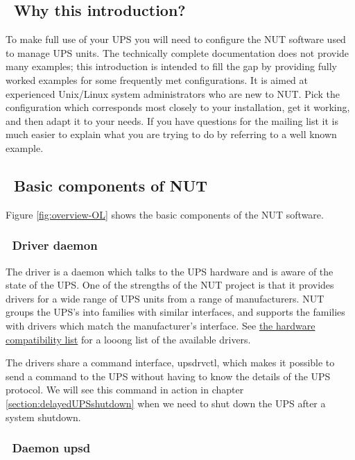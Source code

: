 \documentclass[12pt]{article}
\newlength{\headersep}\setlength{\headersep}{3mm}
\newcommand{\Hsep}{\hspace{\headersep}}
\newcommand{\upsd}{\mbox{\textcolor{UPSDCOLOUR}{upsd}}}
\newcommand{\upsdrvctl}{\mbox{\textcolor{UPSDCOLOUR}{upsdrvctl}}}
\newcommand{\HCL}{http://www.networkupstools.org/stable-hcl.html}
\begin{document}
\subsection{\Hsep\ Why this introduction?}\label{whythisintro}

To make full use of your UPS you will need to configure the NUT software used
to manage UPS units.  The technically complete documentation does not provide
many examples; this introduction is intended to fill the gap by providing
fully worked examples for some frequently met configurations.  It is aimed at
experienced Unix/Linux system administrators who are new to NUT.  Pick the
configuration which corresponds most closely to your installation, get it
working, and then adapt it to your needs.  If you have questions for the
mailing list it is much easier to explain what you are trying to do by
referring to a well known example.


\subsection{\Hsep\ Basic components of NUT}\label{section:basiccomponents}

Figure \ref{fig:overview-OL} shows the basic components of the NUT software.

\subsubsection{\Hsep\ Driver daemon}\label{section:driver}

The driver is a daemon which talks to the UPS hardware and is aware of the
state of the UPS.  One of the strengths of the NUT project is that it provides
drivers for a wide range of UPS units from a range of manufacturers.  NUT
groups the UPS's into families with similar interfaces, and supports the
families with drivers which match the manufacturer's interface.  See
\href{\HCL}{the hardware compatibility list} for a looong list of the
available drivers.

The drivers share a command interface, \upsdrvctl, which makes it possible to
send a command to the UPS without having to know the details of the UPS
protocol.  We will see this command in action in chapter
\ref{section:delayedUPSshutdown} when we need to shut down the UPS after a
system shutdown.

\subsubsection{\Hsep\ Daemon \upsd}\label{section:upsd}
\end{document}
